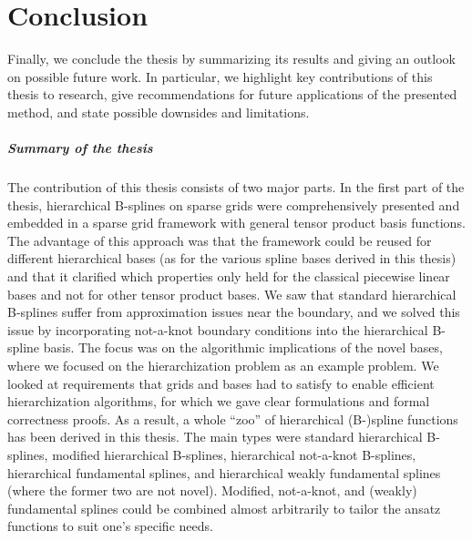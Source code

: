 \chapter{Conclusion}
\label{chap:90conclusion}

\noindent
Finally, we conclude the thesis by summarizing its results
and giving an outlook on possible future work.
In particular, we highlight key contributions of this thesis to research,
give recommendations for future applications of the presented method, and
state possible downsides and limitations.

\paragraph{Summary of the thesis}

The contribution of this thesis consists of two major parts.
In the first part of the thesis,
hierarchical B-splines on sparse grids were comprehensively presented
and embedded in a sparse grid framework with general
tensor product basis functions.
The advantage of this approach was that the framework could be reused
for different hierarchical bases
(as for the various spline bases derived in this thesis)
and that it clarified which properties only held for the
classical piecewise linear bases and not for other tensor product bases.
We saw that standard hierarchical B-splines suffer from
approximation issues near the boundary, and
we solved this issue by incorporating not-a-knot boundary conditions
into the hierarchical B-spline basis.
The focus was on the algorithmic implications
of the novel bases, where we focused on the hierarchization problem as
an example problem.
We looked at requirements that grids and bases had to satisfy
to enable efficient hierarchization algorithms,
for which we gave clear formulations and formal correctness proofs.
As a result, a whole ``zoo'' of hierarchical (B-)spline functions
has been derived in this thesis.
The main types were
standard hierarchical B-splines,
modified hierarchical B-splines,
hierarchical not-a-knot B-splines,
hierarchical fundamental splines, and
hierarchical weakly fundamental splines
(where the former two are not novel).
Modified, not-a-knot, and (weakly) fundamental splines could be combined
almost arbitrarily to tailor the ansatz functions to suit one's specific needs.

